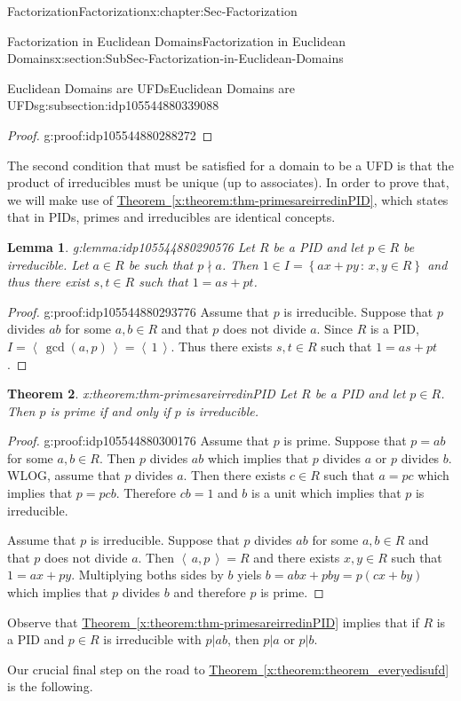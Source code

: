 \documentclass[oneside,10pt,]{book}
\newcommand{\xreffont}{\relax}
\numberwithin{equation}{section}
\newcommand{\ideal}[1]{\left\langle\, #1 \,\right\rangle}
\newcommand{\setof}[2]{{\left\{#1\,\colon\,#2\right\}}}
\newtheorem{theorem}{Theorem}[section]
\newtheorem{lemma}[theorem]{Lemma}
\begin{document}
\begin{chapterptx}{Factorization}{}{Factorization}{}{}{x:chapter:Sec-Factorization}
\begin{sectionptx}{Factorization in Euclidean Domains}{}{Factorization in Euclidean Domains}{}{}{x:section:SubSec-Factorization-in-Euclidean-Domains}
\begin{subsectionptx}{Euclidean Domains are UFDs}{}{Euclidean Domains are UFDs}{}{}{g:subsection:idp105544880339088}
\begin{proof}{}{g:proof:idp105544880288272}
\end{proof}
The second condition that must be satisfied for a domain to be a UFD is that the product of irreducibles must be unique (up to associates). In order to prove that, we will make use of \hyperref[x:theorem:thm-primesareirredinPID]{Theorem~{\xreffont\ref{x:theorem:thm-primesareirredinPID}}}, which states that in PIDs, primes and irreducibles are identical concepts.%
\begin{lemma}{}{}{g:lemma:idp105544880290576}%
Let \(R\) be a PID and let \(p\in R\) be irreducible. Let \(a\in R\) be such that \(p\nmid a\). Then \(1\in I = \setof{ax+py}{x,y\in R}\) and thus there exist \(s,t\in R\) such that \(1 = as+pt\).%
\end{lemma}
\begin{proof}{}{g:proof:idp105544880293776}
Assume that \(p\) is irreducible. Suppose that \(p\) divides \(ab\) for some \(a,b \in R\) and that \(p\) does not divide \(a\). Since \(R\) is a PID, \(I = \ideal{\gcd(a,p)} = \ideal{1}\). Thus there exists \(s,t\in R\) such that \(1=as+pt\).%
\end{proof}
\begin{theorem}{}{}{x:theorem:thm-primesareirredinPID}%
Let \(R\) be a PID and let \(p\in R\). Then \(p\) is prime if and only if \(p\) is irreducible.%
\end{theorem}
\begin{proof}{}{g:proof:idp105544880300176}
Assume that \(p\) is prime. Suppose that \(p=ab\) for some \(a,b \in R\). Then \(p\) divides \(ab\) which implies that \(p\) divides \(a\) or \(p\) divides \(b\). WLOG, assume that \(p\) divides \(a\). Then there exists \(c\in R\) such that \(a=pc\) which implies that \(p=pcb\). Therefore \(cb=1\) and \(b\) is a unit which implies that \(p\) is irreducible.%
\par
Assume that \(p\) is irreducible. Suppose that \(p\) divides \(ab\) for some \(a,b \in R\) and that \(p\) does not divide \(a\). Then \(\ideal{a,p}=R\) and there exists \(x,y\in R\) such that \(1=ax+py\). Multiplying boths sides by \(b\) yiels \(b=abx+pby=p(cx+by)\) which implies that \(p\) divides \(b\) and therefore \(p\) is prime.%
\end{proof}
Observe that \hyperref[x:theorem:thm-primesareirredinPID]{Theorem~{\xreffont\ref{x:theorem:thm-primesareirredinPID}}} implies that if \(R\) is a PID and \(p\in R\) is irreducible with \(p|ab\), then \(p|a\) or \(p|b\).%
\par
Our crucial final step on the road to \hyperref[x:theorem:theorem_everyedisufd]{Theorem~{\xreffont\ref{x:theorem:theorem_everyedisufd}}} is the following.%

\end{subsectionptx}
\end{sectionptx}
\end{chapterptx}
\end{document}
